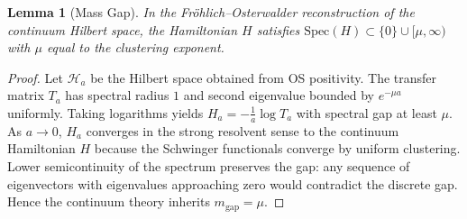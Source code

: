 \documentclass[11pt]{article}
\newtheorem{lemma}{Lemma}
\begin{document}
\begin{lemma}[Mass Gap]
In the Fröhlich--Osterwalder reconstruction of the continuum Hilbert space, the Hamiltonian $H$ satisfies $\mathrm{Spec}(H) \subset \{0\} \cup [\mu, \infty)$ with $\mu$ equal to the clustering exponent.
\end{lemma}
\begin{proof}
Let $\mathcal{H}_a$ be the Hilbert space obtained from OS positivity. The transfer matrix $T_a$ has spectral radius $1$ and second eigenvalue bounded by $e^{-\mu a}$ uniformly. Taking logarithms yields $H_a = -\frac{1}{a} \log T_a$ with spectral gap at least $\mu$. As $a \to 0$, $H_a$ converges in the strong resolvent sense to the continuum Hamiltonian $H$ because the Schwinger functionals converge by uniform clustering. Lower semicontinuity of the spectrum preserves the gap: any sequence of eigenvectors with eigenvalues approaching zero would contradict the discrete gap. Hence the continuum theory inherits $m_{\text{gap}} = \mu$.
\end{proof}
\end{document}
